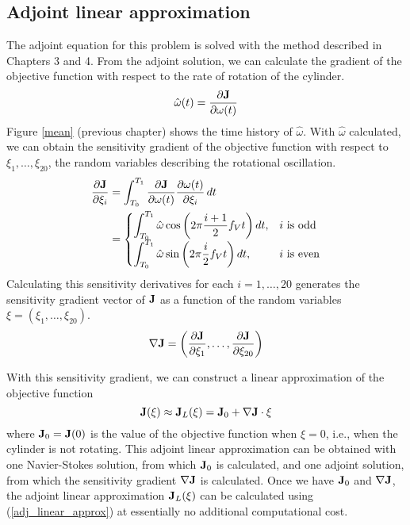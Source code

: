 \subsection{Adjoint linear approximation}

The adjoint equation for this problem is solved with the method described in
Chapters 3 and 4.  From the adjoint solution, we can calculate the
gradient of the objective function with respect to the rate of rotation of the
cylinder.
\[ {\hat \omega}(t) = \frac{\partial {\bf J}}{\partial \omega(t)} \]
Figure \ref{mean} (previous chapter) shows the time history
of $\hat \omega$.  With $\hat \omega$ calculated, we can obtain the
sensitivity gradient of the objective function with respect to
$\xi_1, \ldots, \xi_{20}$, the random variables describing the rotational
oscillation.
\[\begin{split}
   \frac{\partial {\bf J}}{\partial \xi_i}
&= \int_{T_0}^{T_1} \frac{\partial {\bf J}}{\partial \omega(t)}
        \frac{\partial \omega(t)}{\partial \xi_i} \,dt \\
&= \begin{cases}
   \displaystyle \int_{T_0}^{T_1} {\hat\omega}
                 \cos \left(2\pi \frac{i+1}{2} f_V t\right) dt,
   & i \mbox{ is odd} \\
   \displaystyle \int_{T_0}^{T_1} {\hat\omega}
                 \sin \left(2\pi \frac{i}{2} f_V t\right) dt,
   & i \mbox{ is even}
   \end{cases}
\end{split}\]
Calculating this sensitivity derivatives for each $i=1,\ldots,20$ generates
the sensitivity gradient vector of $\bf J$ as a function of the random
variables $\xi = (\xi_1,\ldots,\xi_{20})$.
\[ \nabla {\bf J} = \left(\frac{\partial {\bf J}}{\partial \xi_1}, \ldots,
                          \frac{\partial {\bf J}}{\partial \xi_{20}}\right) \]

With this sensitivity gradient, we can construct a linear approximation
of the objective function
\begin{equation} \label{adj_linear_approx}
{\bf J}(\xi) \approx {\bf J}_L(\xi) = {\bf J}_0 + \nabla {\bf J} \cdot \xi
\end{equation}
where ${\bf J}_0 = {\bf J}(0)$ is the value of the objective function
when $\xi = 0$, i.e., when the cylinder is not rotating.
This adjoint linear approximation can be obtained with one Navier-Stokes
solution, from which ${\bf J}_0$ is calculated, and one adjoint solution,
from which the sensitivity gradient $\nabla {\bf J}$ is calculated.
Once we have ${\bf J}_0$ and $\nabla {\bf J}$, the adjoint linear approximation
${\bf J}_L(\xi)$ can be calculated using (\ref{adj_linear_approx}) at
essentially no additional computational cost.

